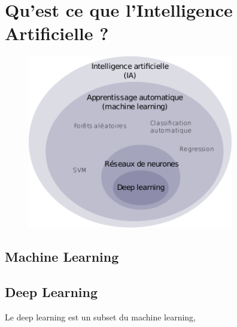 
\chapter{Qu'est ce que l'Intelligence Artificielle ?}
\begin{figure}[!h]
    \centering
    \includegraphics[width=0.8\textwidth]{Images/aitype}
\end{figure}

\section{Machine Learning}


\section{Deep Learning}
Le deep learning est un subset du machine learning, 

\chapter{}